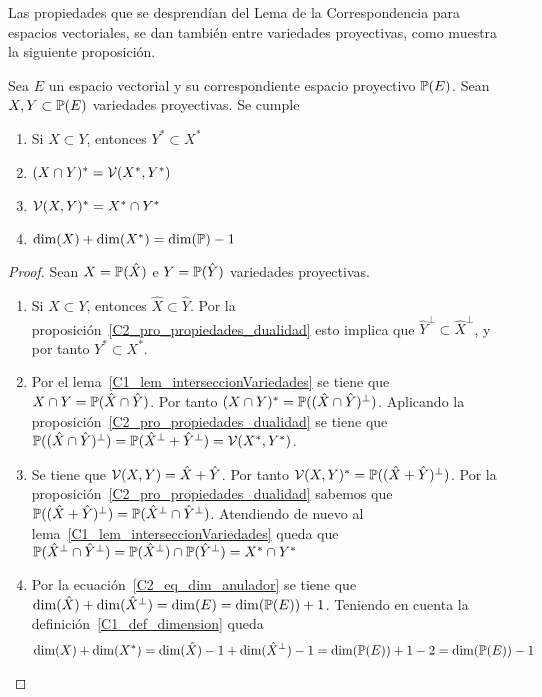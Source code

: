 Las propiedades que se desprendían del Lema de la Correspondencia para espacios vectoriales, se dan también entre variedades proyectivas, como muestra la siguiente proposición.
\begin{prop}
	\label{C2_pro_propiedades_dualidad_proy}
	Sea $E$ un espacio vectorial y su correspondiente espacio proyectivo $\mathbb{P}(E)$. Sean $X,Y\subset\mathbb{P}(E)$ variedades proyectivas. Se cumple
	\begin{enumerate}
		\item Si $X\subset Y$, entonces $Y^*\subset X^*$
		
		\item $(X\cap Y)^*=\mathcal{V}(X^*,Y^*)$
		
		\item $\mathcal{V}(X,Y)^*=X^*\cap Y^*$
		
		\item $\dim(X)+\dim(X^*)=\dim(\mathbb{P})-1$
	\end{enumerate}
\end{prop}
\begin{proof}
	Sean $X=\mathbb{P}(\hat{X})$ e $Y=\mathbb{P}(\hat{Y})$ variedades proyectivas.
	\begin{enumerate}
		\item Si $X\subset Y$, entonces $\hat{X}\subset\hat{Y}$. Por la proposición~\ref{C2_pro_propiedades_dualidad} esto implica que $\hat{Y}^{\perp}\subset \hat{X}^{\perp}$, y por tanto $Y^*\subset X^*$.
		
		\item Por el lema~\ref{C1_lem_interseccionVariedades} se tiene que $X\cap Y=\mathbb{P}(\hat{X}\cap\hat{Y})$. Por tanto $(X\cap Y)^*=\mathbb{P}((\hat{X}\cap\hat{Y})^{\perp})$. Aplicando la proposición~\ref{C2_pro_propiedades_dualidad} se tiene que $\mathbb{P}((\hat{X}\cap\hat{Y})^{\perp})=\mathbb{P}(\hat{X}^{\perp}+\hat{Y}^{\perp})=\mathcal{V}(X^*,Y^*)$.
		
		\item Se tiene que $\mathcal{V}(X,Y)=\hat{X}+\hat{Y}$. Por tanto $\mathcal{V}(X,Y)^*=\mathbb{P}((\hat{X}+\hat{Y})^{\perp})$. Por la proposición~\ref{C2_pro_propiedades_dualidad} sabemos que $\mathbb{P}((\hat{X}+\hat{Y})^{\perp})=\mathbb{P}(\hat{X}^{\perp}\cap\hat{Y}^{\perp})$. Atendiendo de nuevo al lema~\ref{C1_lem_interseccionVariedades} queda que $\mathbb{P}(\hat{X}^{\perp}\cap\hat{Y}^{\perp})=\mathbb{P}(\hat{X}^{\perp})\cap\mathbb{P}(\hat{Y}^{\perp})=X^*\cap Y^*$
		
		\item Por la ecuación~\eqref{C2_eq_dim_anulador} se tiene que $\dim(\hat{X})+\dim(\hat{X}^{\perp})=\dim(E)=\dim(\mathbb{P}(E))+1$. Teniendo en cuenta la definición~\ref{C1_def_dimension} queda
		\begin{equation*}
		\dim(X)+\dim(X^*)=\dim(\hat{X})-1+\dim(\hat{X}^{\perp})-1=\dim(\mathbb{P}(E))+1-2=\dim(\mathbb{P}(E))-1
		\end{equation*}
	\end{enumerate}
\end{proof}
